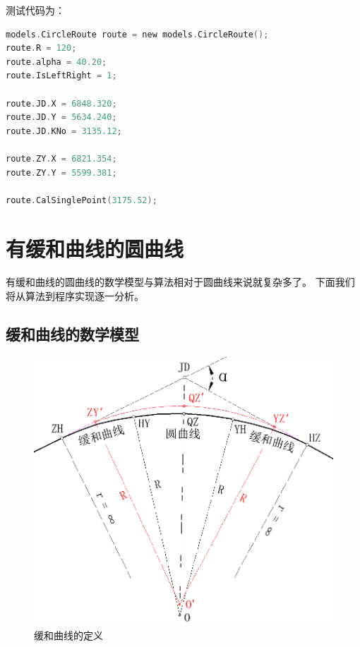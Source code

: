 测试代码为：
\begin{lstlisting}[language=C]
models.CircleRoute route = new models.CircleRoute();
route.R = 120;
route.alpha = 40.20;
route.IsLeftRight = 1;

route.JD.X = 6848.320;
route.JD.Y = 5634.240;
route.JD.KNo = 3135.12;

route.ZY.X = 6821.354;
route.ZY.Y = 5599.381;

route.CalSinglePoint(3175.52);
\end{lstlisting}

\section{有缓和曲线的圆曲线}

有缓和曲线的圆曲线的数学模型与算法相对于圆曲线来说就复杂多了。
下面我们将从算法到程序实现逐一分析。

\subsection{缓和曲线的数学模型}

 \begin{figure}[htbp]
    \centering
    \includegraphics[scale=0.6]{route/HY01.png}
    \caption{缓和曲线的定义}
    \label{fig:HR01}
\end{figure}


